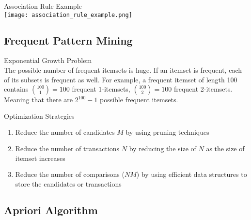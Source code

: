 \multend

\begin{example2}{Association Rule Example}\\
    \texttt{[image: association\_rule\_example.png]}
\end{example2}


\raggedcolumns
\columnbreak

\subsection{Frequent Pattern Mining}

\begin{concept}{Exponential Growth Problem}\\
The possible number of frequent itemsets is huge. If an itemset is frequent, each of its subsets is frequent as well. For example, a frequent itemset of length 100 contains $\binom{100}{1} = 100$ frequent 1-itemsets, $\binom{100}{2} = 100$ frequent 2-itemsets. Meaning that there are $2^{100} - 1$ possible frequent itemsets.
\end{concept}

\begin{concept}{Optimization Strategies}
\begin{enumerate}
    \item Reduce the number of candidates $M$ by using pruning techniques
    \item Reduce the number of transactions $N$ by reducing the size of $N$ as the size of itemset increases
    \item Reduce the number of comparisons ($NM$) by using efficient data structures to store the candidates or transactions
\end{enumerate}
\end{concept}

\subsection{Apriori Algorithm}


